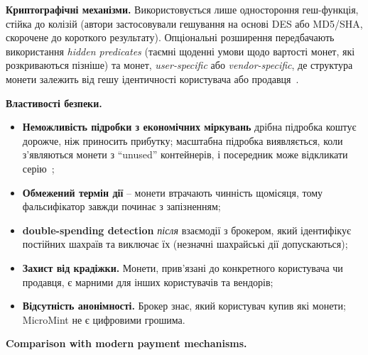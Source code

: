 \textbf{Криптографічні механізми.} Використовується лише одностороння геш-функція, стійка до колізій (автори 
застосовували гешування на основі DES або MD5/SHA, скорочене до короткого результату). Опціональні розширення 
передбачають використання \emph{hidden predicates} (таємні щоденні умови щодо вартості монет, які розкриваються пізніше) 
та монет, \emph{user-specific} або \emph{vendor-specific}, де структура монети залежить від гешу ідентичності 
користувача або продавця~\cite{rivest1996micromint}.

\textbf{Властивості безпеки.}
\begin{itemize}[noitemsep]
    \item \textbf{Неможливість підробки з економічних міркувань} дрібна підробка коштує дорожче, ніж приносить 
        прибутку; масштабна підробка виявляється, коли з'являються монети з \enquote{unused} контейнерів, і 
        посередник може відкликати серію~\cite{rivest1996micromint};
    \item \textbf{Обмежений термін дії} -- монети втрачають чинність щомісяця, тому фальсифікатор завжди починає 
        з запізненням;
    \item \textbf{double-spending detection} \emph{після} взаємодії з брокером, який ідентифікує постійних шахраїв 
        та виключає їх (незначні шахрайські дії допускаються);
    \item \textbf{Захист від крадіжки.} Монети, прив'язані до конкретного користувача чи продавця, є марними для 
        інших користувачів та вендорів;
    \item \textbf{Відсутність анонімності.} Брокер знає, який користувач купив які монети; MicroMint не є цифровими 
        грошима.
\end{itemize}

\textbf{Comparison with modern payment mechanisms.}

